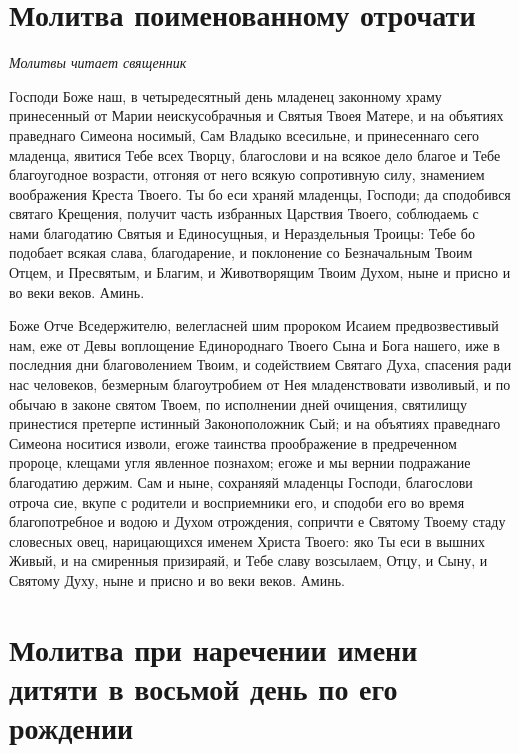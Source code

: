 
 

\section{Молитва поименованному отрочати}
 


\itshape Молитвы читает священник\normalfont{}

Господи Боже наш, в четыредесятный день младенец законному храму принесенный от Марии неискусобрачныя и Святыя Твоея Матере, и на объятиях праведнаго Симеона носимый, Сам Владыко всесильне, и принесеннаго сего младенца, явитися Тебе всех Творцу, благослови и на всякое дело благое и Тебе благоугодное возрасти, отгоняя от него всякую сопротивную силу, знамением воображения Креста Твоего. Ты бо еси храняй младенцы, Господи; да сподобився святаго Крещения, получит часть избранных Царствия Твоего, соблюдаемь с нами благодатию Святыя и Единосущныя, и Нераздельныя Троицы: Тебе бо подобает всякая слава, благодарение, и поклонение со Безначальным Твоим Отцем, и Пресвятым, и Благим, и Животворящим Твоим Духом, ныне и присно и во веки веков. Аминь. 


Боже Отче Вседержителю, велегласней шим пророком Исаием предвозвестивый нам, еже от Девы воплощение Единороднаго Твоего Сына и Бога нашего, иже в последния дни благоволением Твоим, и содействием Святаго Духа, спасения ради нас человеков, безмерным благоутробием от Нея младенствовати изволивый, и по обычаю в законе святом  Твоем, по исполнении дней очищения, святилищу принестися претерпе истинный Законоположник Сый; и на объятиях праведнаго Симеона носитися изволи, егоже таинства проображение в предреченном пророце, клещами угля явленное познахом; егоже и мы вернии подражание благодатию держим. Сам и ныне, сохраняяй младенцы Господи, благослови отроча сие, вкупе с родители и восприемники его, и сподоби его во время благопотребное и водою и Духом отрождения, сопричти е Святому Твоему стаду словесных овец, нарицающихся именем Христа Твоего: яко Ты еси в вышних Живый, и на смиренныя призираяй, и Тебе славу возсылаем, Отцу, и Сыну, и Святому Духу, ныне и присно и во веки веков. Аминь.





\section{Молитва при наречении имени дитяти в восьмой день по его рождении}
 


